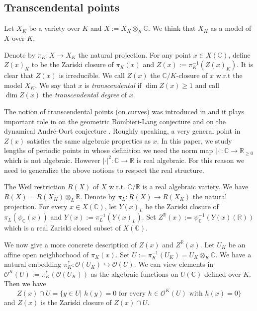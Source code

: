 \documentclass[12pt]{amsart}
\theoremstyle{plain}
\theoremstyle{remark}
\theoremstyle{definition}
\def\R{\mathbb R}
\def\C{\mathbb C}
\def\sO{\mathcal O}
\begin{document}
\subsection{Transcendental points}\label{sectiontranpoint}
Let $X_K$ be a variety over $K$ and $X:= X_{K}\otimes_K \C$. We think that $X_K$ as a model of $X$ over $K.$

Denote by $\pi_K: X\to X_K$ the natural projection. For any point $x\in X(\C)$, define $Z(x)_K$ to be the Zariski closure of $\pi_K(x)$
and $Z(x):=\pi_K^{-1}(Z(x)_K)$. It is clear that $Z(x)$ is irreducible. We call $Z(x)$ the $\C/K$-closure of $x$ w.r.t the model $X_K.$
We say that $x$ is \emph{transcendental} if $\dim Z(x)\geq 1$ and call $\dim Z(x)$ the \emph{transcendental degree} of $x.$

\medskip

The notion of transcendental points (on curves) was introduced in \cite[Section 4.1]{Partial} and it plays important role in \cite{Partial} on the geometric Bombieri-Lang conjecture and \cite{ji2023dao} on the dynamical Andr\'e-Oort conjecture .
Roughly speaking, a very general point in $Z(x)$ satisfies the same algebraic properties as $x.$
In this paper, we study lengths of periodic points in whose definition we need the norm map $|\cdot |: \C\to \R_{\geq 0}$ which is not algebraic. 
However $|\cdot|^2: \C\to \R$ is real algebraic.
For this reason we need to generalize the above notions to respect the real structure. 

\medskip

The Weil restriction $R(X)$ of $X$ w.r.t. $\C/\R$ is a real algebraic variety.  We have $R(X)=R(X_K)\otimes_{L}\R.$ Denote by $\pi_L: R(X)\to R(X_K)$ the natural projection.
For every $x\in X(\C)$, let $Y(x)_L$ be the Zariski closure of $\pi_L(\psi_\C(x))$ and $Y(x):=\pi_L^{-1}(Y(x)_L)$. Set $Z^{\R}(x):=\psi_\C^{-1}(Y(x)(\R))$ which is a real Zariski closed subset of $X(\C).$ 

\medskip


We now give a more concrete description of $Z(x)$ and $Z^{\R}(x)$. Let $U_K$ be an affine open neighborhood of $\pi_K(x)$. Set $U:=\pi^{-1}_K(U_K)=U_K\otimes_K\C$. We have a natural embedding $\pi_K^*: \sO(U_K)\hookrightarrow \sO(U)$. We can view elements in $\sO^K(U):=\pi_K^*(\sO(U_K))$ as the algebraic functions on $U(\C)$ defined over $K.$ 
Then we have $$Z(x)\cap U=\{y\in U|\,\, h(y)=0 \text{ for every } h\in \sO^K(U) \text{ with } h(x)=0\}$$ and $Z(x)$ is the Zariski closure of $Z(x)\cap U.$

\medskip
\end{document}
